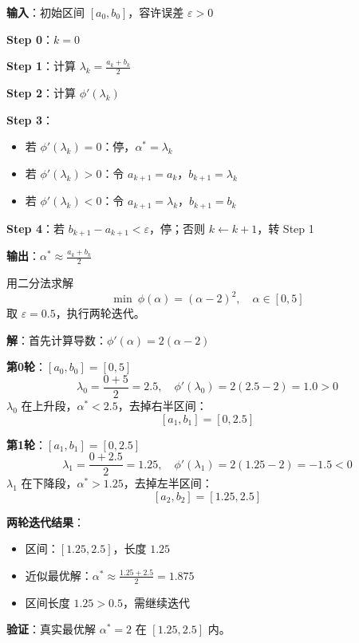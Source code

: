\begin{algobox}[二分法算法]
\textbf{输入}：初始区间 $[a_0, b_0]$，容许误差 $\varepsilon > 0$

\textbf{Step 0}：$k = 0$

\textbf{Step 1}：计算 $\lambda_k = \frac{a_k + b_k}{2}$

\textbf{Step 2}：计算 $\phi'(\lambda_k)$

\textbf{Step 3}：
\begin{itemize}
    \item 若 $\phi'(\lambda_k) = 0$：停，$\alpha^* = \lambda_k$
    \item 若 $\phi'(\lambda_k) > 0$：令 $a_{k+1} = a_k$，$b_{k+1} = \lambda_k$
    \item 若 $\phi'(\lambda_k) < 0$：令 $a_{k+1} = \lambda_k$，$b_{k+1} = b_k$
\end{itemize}

\textbf{Step 4}：若 $b_{k+1} - a_{k+1} < \varepsilon$，停；否则 $k \leftarrow k+1$，转 Step 1

\textbf{输出}：$\alpha^* \approx \frac{a_k + b_k}{2}$
\end{algobox}

\begin{example}\label{ex:bisection}
用二分法求解
\[
\min\ \phi(\alpha) = (\alpha - 2)^2,\quad \alpha \in [0, 5]
\]
取 $\varepsilon = 0.5$，执行两轮迭代。

\textbf{解}：首先计算导数：$\phi'(\alpha) = 2(\alpha - 2)$

\textbf{第0轮}：$[a_0, b_0] = [0, 5]$
\[
\lambda_0 = \frac{0 + 5}{2} = 2.5,\quad \phi'(\lambda_0) = 2(2.5 - 2) = 1.0 > 0
\]
$\lambda_0$ 在上升段，$\alpha^* < 2.5$，去掉右半区间：
\[
[a_1, b_1] = [0, 2.5]
\]

\textbf{第1轮}：$[a_1, b_1] = [0, 2.5]$
\[
\lambda_1 = \frac{0 + 2.5}{2} = 1.25,\quad \phi'(\lambda_1) = 2(1.25 - 2) = -1.5 < 0
\]
$\lambda_1$ 在下降段，$\alpha^* > 1.25$，去掉左半区间：
\[
[a_2, b_2] = [1.25, 2.5]
\]

\textbf{两轮迭代结果}：
\begin{itemize}
    \item 区间：$[1.25, 2.5]$，长度 $1.25$
    \item 近似最优解：$\alpha^* \approx \frac{1.25 + 2.5}{2} = 1.875$
    \item 区间长度 $1.25 > 0.5$，需继续迭代
\end{itemize}

\textbf{验证}：真实最优解 $\alpha^* = 2$ 在 $[1.25, 2.5]$ 内。
\end{example}

